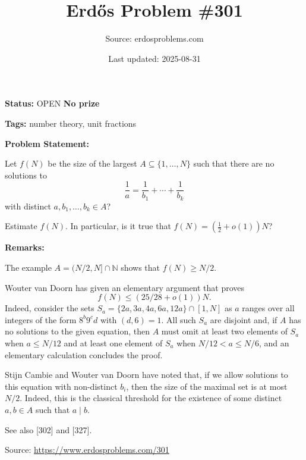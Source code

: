 \documentclass{article}
\title{Erd\H{o}s Problem \#301}
\date{Last updated: 2025-08-31}
\author{Source: erdosproblems.com}
\begin{document}
\maketitle

\noindent\textbf{Status:} OPEN \quad \textbf{No prize}

\noindent\textbf{Tags:} number theory, unit fractions

\medskip
\noindent\textbf{Problem Statement:}

Let $f(N)$ be the size of the largest $A\subseteq \{1,\ldots,N\}$ such that there are no solutions to\[\frac{1}{a}= \frac{1}{b_1}+\cdots+\frac{1}{b_k}\]with distinct $a,b_1,\ldots,b_k\in A$?

Estimate $f(N)$. In particular, is it true that $f(N)=(\tfrac{1}{2}+o(1))N$?

\bigskip
\noindent\textbf{Remarks:}

The example $A=(N/2,N]\cap \mathbb{N}$ shows that $f(N)\geq N/2$.

Wouter van Doorn has given an elementary argument that proves\[f(N)\leq (25/28+o(1))N.\]Indeed, consider the sets $S_a=\{2a,3a,4a,6a,12a\}\cap [1,N]$ as $a$ ranges over all integers of the form $8^b9^cd$ with $(d,6)=1$. All such $S_a$ are disjoint and, if $A$ has no solutions to the given equation, then $A$ must omit at least two elements of $S_a$ when $a\leq N/12$ and at least one element of $S_a$ when $N/12<a\leq N/6$, and an elementary calculation concludes the proof.

Stijn Cambie and Wouter van Doorn have noted that, if we allow solutions to this equation with non-distinct $b_i$, then the size of the maximal set is at most $N/2$. Indeed, this is the classical threshold for the existence of some distinct $a,b\in A$ such that $a\mid b$.

See also [302] and [327].

\bigskip
\noindent\small{Source: \url{https://www.erdosproblems.com/301}}
\end{document}
